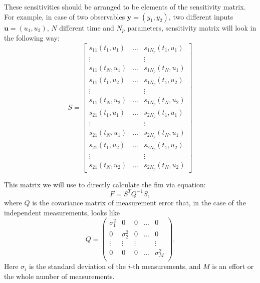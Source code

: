\documentclass[10pt,A4paper]{article}
\newcommand{\mbu}{\mathbf{u}}
\newcommand{\mby}{\mathbf{y}}
\begin{document}
These sensitivities should be arranged to be elements of the sensitivity matrix.
For example, in case of two observables $\mby = (y_1, y_2)$, two different inputs $\mbu = (u_1, u_2)$, $N$ different time and $N_p$ parameters, sensitivity matrix will look in the following way:
\begin{equation}
    S = 
\begin{bmatrix}
s_{11} (t_1, u_1) & ... & s_{1 N_p}(t_1, u_1) \\
\vdots  &   & \vdots  \\
s_{11} (t_{N}, u_1) & ... & s_{1 N_p} (t_{N}, u_1)\\
s_{11} (t_1, u_2) & ... & s_{1 N_p}(t_1, u_2) \\
\vdots  &   & \vdots  \\
s_{11} (t_N, u_2) & ... & s_{1 N_p} (t_N, u_2)\\

s_{21} (t_1, u_1) & ... & s_{2 N_p}(t_1, u_1) \\
\vdots  &   & \vdots  \\
s_{21} (t_{N}, u_1) & ... & s_{2 N_p} (t_{N}, u_1)\\
s_{21} (t_1, u_2) & ... & s_{2 N_p}(t_1, u_2) \\
\vdots  &   & \vdots  \\
s_{21} (t_N, u_2) & ... & s_{2 N_p} (t_N, u_2)
\end{bmatrix}
\label{eq:sens_matrix}
\end{equation}

This matrix we will use to directly calculate the \ac{fim} via equation:
\begin{equation}
    F = S^T Q^{-1} S,
\end{equation}
where $Q$ is the covariance matrix of measurement error that, in the case of the independent measurements, looks like 
\begin{equation}
    Q = 
\begin{pmatrix}
\sigma_1^2 & 0 & 0 & ... & 0\\
0 & \sigma_2^2 & 0 & ... & 0\\
\vdots  & \vdots  & \vdots  &   & \vdots  \\
0 & 0 & 0 & ... & \sigma_M^2 \\
\end{pmatrix}.
\end{equation}
Here $\sigma_i$ is the standard deviation of the $i$-th measurements, and $M$ is an effort or the whole number of measurements.
%
\end{document}
